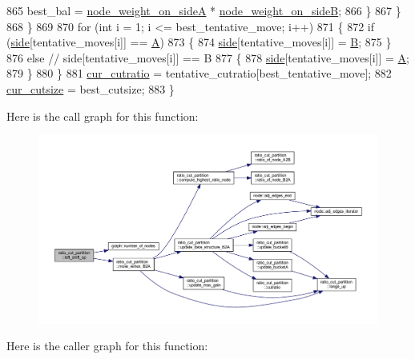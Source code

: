 \begin{DoxyCode}
865         best\_bal = \mbox{\hyperlink{classratio__cut__partition_af1b839e48e498cf8ca93c8ec5df8a686}{node\_weight\_on\_sideA}} * 
      \mbox{\hyperlink{classratio__cut__partition_aa16d1b508db86eb0ba4824642394999a}{node\_weight\_on\_sideB}};
866         \}
867     \}
868     \}
869 
870     \textcolor{keywordflow}{for} (\textcolor{keywordtype}{int} i = 1; i <= best\_tentative\_move; i++)
871     \{
872     \textcolor{keywordflow}{if} (\mbox{\hyperlink{classratio__cut__partition_a2bf913d1d8607747885177a3b585e611}{side}}[tentative\_moves[i]] == \mbox{\hyperlink{classratio__cut__partition_a9c0da5ad845b01bddbc1f238fa35cdd0}{A}})
873     \{
874         \mbox{\hyperlink{classratio__cut__partition_a2bf913d1d8607747885177a3b585e611}{side}}[tentative\_moves[i]] = \mbox{\hyperlink{classratio__cut__partition_adf075987228d8adc7950d5b1ba332daa}{B}};
875     \}
876     \textcolor{keywordflow}{else}    \textcolor{comment}{// side[tentative\_moves[i]] == B}
877     \{
878         \mbox{\hyperlink{classratio__cut__partition_a2bf913d1d8607747885177a3b585e611}{side}}[tentative\_moves[i]] = \mbox{\hyperlink{classratio__cut__partition_a9c0da5ad845b01bddbc1f238fa35cdd0}{A}};
879     \}
880     \}
881     \mbox{\hyperlink{classratio__cut__partition_a9dad324884cef5bcdd50122fc98e0860}{cur\_cutratio}} = tentative\_cutratio[best\_tentative\_move];
882     \mbox{\hyperlink{classratio__cut__partition_aa01f2d6257fff28739e2431fe826ef71}{cur\_cutsize}} = best\_cutsize;
883 \}
\end{DoxyCode}
Here is the call graph for this function\+:\nopagebreak
\begin{figure}[H]
\begin{center}
\leavevmode
\includegraphics[width=350pt]{classratio__cut__partition_af736bd4e468935c1b1642f78d3df665d_cgraph}
\end{center}
\end{figure}
Here is the caller graph for this function\+:\nopagebreak
